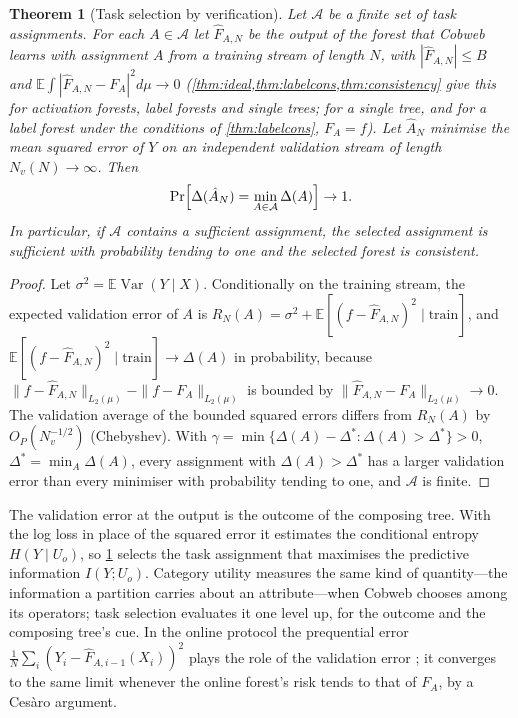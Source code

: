 \documentclass[11pt]{article}
\newtheorem{theorem}{Theorem}
\theoremstyle{definition}
\theoremstyle{remark}
\newcommand{\E}{\mathbb{E}}
\newcommand{\cA}{\mathcal{A}}
\newcommand{\Var}{\operatorname{Var}}
\begin{document}
\begin{theorem}[Task selection by verification]\label{thm:selection}
Let $\cA$ be a finite set of task assignments.  For each $A\in\cA$ let $\hat F_{A,N}$ be
the output of the forest that Cobweb learns with assignment $A$ from a training stream
of length $N$, with $|\hat F_{A,N}|\le B$ and $\E\int|\hat F_{A,N}-F_A|^2d\mu\to0$
(\cref{thm:ideal,thm:labelcons,thm:consistency} give this for activation forests, label
forests and single trees; for a single tree, and for a label forest under the conditions
of \cref{thm:labelcons}, $F_A=f$).  Let $\hat A_N$ minimise the mean squared error of $Y$ on an
independent validation stream of length $N_v(N)\to\infty$.  Then
\[
  \Pr\Bigl[\Delta(\hat A_N)=\min_{A\in\cA}\Delta(A)\Bigr]\to1.
\]
In particular, if $\cA$ contains a sufficient assignment, the selected assignment is
sufficient with probability tending to one and the selected forest is consistent.
\end{theorem}
\begin{proof}
Let $\sigma^2=\E\Var(Y\mid X)$.  Conditionally on the training stream, the expected
validation error of $A$ is
$R_N(A)=\sigma^2+\E[(f-\hat F_{A,N})^2\mid\text{train}]$, and
$\E[(f-\hat F_{A,N})^2\mid\text{train}]\to\Delta(A)$ in probability, because
$\|f-\hat F_{A,N}\|_{L_2(\mu)}-\|f-F_A\|_{L_2(\mu)}$ is bounded by
$\|\hat F_{A,N}-F_A\|_{L_2(\mu)}\to0$.  The validation average of the bounded squared
errors differs from $R_N(A)$ by $O_P(N_v^{-1/2})$ (Chebyshev).  With
$\gamma=\min\{\Delta(A)-\Delta^*:\Delta(A)>\Delta^*\}>0$, $\Delta^*=\min_A\Delta(A)$,
every assignment with $\Delta(A)>\Delta^*$ has a larger validation error than every
minimiser with probability tending to one, and $\cA$ is finite.
\end{proof}

The validation error at the output is the outcome of the composing tree.  With the log
loss in place of the squared error it estimates the conditional entropy
$H(Y\mid U_o)$, so \cref{thm:selection} selects the task assignment that maximises the
predictive information $I(Y;U_o)$.  Category utility measures the same kind of
quantity---the information a partition carries about an attribute---when Cobweb chooses
among its operators; task selection evaluates it one level up, for the outcome and the
composing tree's cue.  In
the online protocol the prequential error $\frac1N\sum_i(Y_i-\hat F_{A,i-1}(X_i))^2$
plays the role of the validation error \citep{dawid1984}; it converges to the same limit
whenever the online forest's risk tends to that of $F_A$, by a Ces\`aro argument.
\end{document}
